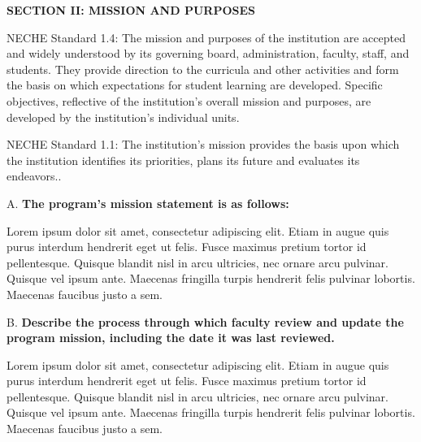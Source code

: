\textbf{SECTION II: MISSION AND PURPOSES}

NECHE Standard 1.4: The mission and purposes of the institution are accepted and widely understood by its governing board, administration, faculty, staff, and students. They provide direction to the curricula and other activities and form the basis on which expectations for student learning are developed. Specific objectives, reflective of the institution’s overall mission and purposes, are developed by the institution’s individual units.

NECHE Standard 1.1: The institution’s mission provides the basis upon which the institution identifies its priorities, plans its future and evaluates its endeavors..

A. \textbf{The program’s mission statement is as follows:}



Lorem ipsum dolor sit amet, consectetur adipiscing elit. Etiam in augue quis purus interdum hendrerit eget ut felis. Fusce maximus pretium tortor id pellentesque. Quisque blandit nisl in arcu ultricies, nec ornare arcu pulvinar. Quisque vel ipsum ante. Maecenas fringilla turpis hendrerit felis pulvinar lobortis. Maecenas faucibus justo a sem. 

B. \textbf{Describe the process through which faculty review and update the program mission, including the date it was last reviewed. }




Lorem ipsum dolor sit amet, consectetur adipiscing elit. Etiam in augue quis purus interdum hendrerit eget ut felis. Fusce maximus pretium tortor id pellentesque. Quisque blandit nisl in arcu ultricies, nec ornare arcu pulvinar. Quisque vel ipsum ante. Maecenas fringilla turpis hendrerit felis pulvinar lobortis. Maecenas faucibus justo a sem. 








